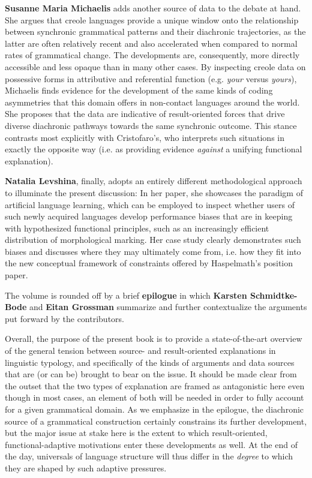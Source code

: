 \documentclass[output=paper]{langsci/langscibook}
\begin{document}
\textbf{Susanne Maria Michaelis} adds another source of data to the debate at hand. She argues that creole languages provide a unique window onto the relationship between synchronic grammatical patterns and their diachronic trajectories, as the latter are often relatively recent and also accelerated when compared to normal rates of grammatical change. The developments are, consequently, more directly accessible and less opaque than in many other cases. By inspecting creole data on possessive forms in attributive and referential function (e.g. \textit{your} versus \textit{yours}), Michaelis finds evidence for the development of the same kinds of coding asymmetries that this domain offers in non-contact languages around the world. She proposes that the data are indicative of result-oriented forces that drive diverse diachronic pathways towards the same synchronic outcome. This stance contrasts most explicitly with Cristofaro’s, who interprets such situations in exactly the opposite way (i.e. as providing evidence \textit{against} a unifying functional explanation).

\textbf{Natalia Levshina}, finally, adopts an entirely different methodological approach to illuminate the present discussion: In her paper, she showcases the paradigm of artificial language learning, which can be employed to inspect whether users of such newly acquired languages develop performance biases that are in keeping with hypothesized functional principles, such as an increasingly efficient distribution of morphological marking. Her case study clearly demonstrates such biases and discusses where they may ultimately come from, i.e. how they fit into the new conceptual framework of constraints offered by Haspelmath’s position paper.
\largerpage

The volume is rounded off by a brief \textbf{epilogue} in which \textbf{Karsten Schmidtke-Bode} and \textbf{Eitan Grossman} summarize and further contextualize the arguments put forward by the contributors. 

Overall, the purpose of the present book is to provide a state-of-the-art overview of the general tension between source- and result-oriented explanations in linguistic typology, and specifically of the kinds of arguments and data sources that are (or can be) brought to bear on the issue. It should be made clear from the outset that the two types of explanation are framed as antagonistic here even though in most cases, an element of both will be needed in order to fully account for a given grammatical domain. As we emphasize in the epilogue, the diachronic source of a grammatical construction certainly constrains its further development, but the major issue at stake here is the extent to which result-oriented, functional-adaptive motivations enter these developments as well. At the end of the day, universals of language structure will thus differ in the \textit{degree} to which they are shaped by such adaptive pressures.
\end{document}
